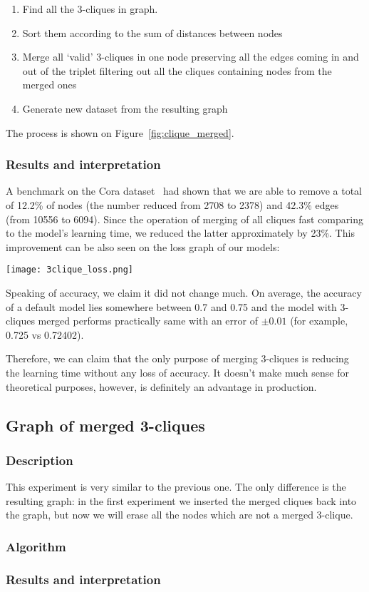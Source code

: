 \begin{enumerate}
    \item Find all the 3-cliques in graph.
    \item Sort them according to the sum of distances between nodes
    \item Merge all `valid' 3-cliques in one node preserving all the edges coming in and out of the triplet filtering out all the cliques containing nodes from the merged ones
    \item Generate new dataset from the resulting graph
\end{enumerate}

The process is shown on Figure~\ref{fig:clique_merged}.

\subsubsection*{Results and interpretation}

A benchmark on the Cora dataset~\cite{cora_dataset} had shown that we are able to remove a total of 12.2\% of nodes (the number reduced from 2708 to 2378) and 42.3\% edges (from 10556 to 6094).
Since the operation of merging of all cliques fast comparing to the model's learning time, we reduced the latter approximately by 23\%.
This improvement can be also seen on the loss graph of our models:

\texttt{[image: 3clique\_loss.png]}

Speaking of accuracy, we claim it did not change much.
On average, the accuracy of a default model lies somewhere between 0.7 and 0.75 and the model with 3-cliques merged performs practically same with an error of $\pm 0.01$ (for example, 0.725 vs 0.72402).

Therefore, we can claim that the only purpose of merging 3-cliques is reducing the learning time without any loss of accuracy.
It doesn't make much sense for theoretical purposes, however, is definitely an advantage in production.

\subsection{Graph of merged 3-cliques}

\subsubsection*{Description}

This experiment is very similar to the previous one.
The only difference is the resulting graph: in the first experiment we inserted the merged cliques back into the graph, but now we will erase all the nodes which are not a merged 3-clique.

\subsubsection*{Algorithm}
\subsubsection*{Results and interpretation}